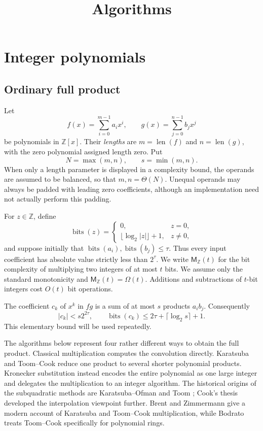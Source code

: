 \documentclass[11pt]{book}
\title{Algorithms}
\author{}
\date{}
\theoremstyle{definition}
\newcommand{\ZZ}{\mathbb Z}
\newcommand{\len}{\operatorname{len}}
\newcommand{\bits}{\operatorname{bits}}
\newcommand{\MZ}{\mathsf M_{\ZZ}}
\begin{document}
\maketitle
\tableofcontents

\chapter{Integer polynomials}

\section{Ordinary full product}

Let
\[
 f(x)=\sum_{i=0}^{m-1} a_i x^i,
 \qquad
 g(x)=\sum_{j=0}^{n-1} b_j x^j
\]
be polynomials in $\ZZ[x]$.  Their \emph{lengths} are $m=\len(f)$ and
$n=\len(g)$, with the zero polynomial assigned length zero.  Put
\[
 N=\max(m,n), \qquad s=\min(m,n).
\]
When only a length parameter is displayed in a complexity bound, the operands
are assumed to be balanced, so that $m,n=\Theta(N)$.  Unequal operands may
always be padded with leading zero coefficients, although an implementation
need not actually perform this padding.

For $z\in\ZZ$, define
\[
 \bits(z)=
 \begin{cases}
  0, & z=0,\\
  \lfloor\log_2|z|\rfloor+1, & z\ne0,
 \end{cases}
\]
and suppose initially that $\bits(a_i),\bits(b_j)\leq\tau$.  Thus every
input coefficient has absolute value strictly less than $2^\tau$.  We write
$\MZ(t)$ for the bit complexity of multiplying two integers of at most $t$
bits.  We assume only the standard monotonicity and $\MZ(t)=\Omega(t)$.
Additions and subtractions of $t$-bit integers cost $O(t)$ bit operations.

The coefficient $c_k$ of $x^k$ in $fg$ is a sum of at most $s$ products
$a_i b_j$.  Consequently
\begin{equation}\label{eq:product-coefficient-bound}
 |c_k| < s2^{2\tau},
 \qquad
 \bits(c_k)\leq 2\tau+\lceil\log_2 s\rceil+1.
\end{equation}
This elementary bound will be used repeatedly.

The algorithms below represent four rather different ways to obtain the full
product.  Classical multiplication computes the convolution directly.
Karatsuba and Toom--Cook reduce one product to several shorter polynomial
products.  Kronecker substitution instead encodes the entire polynomial as one
large integer and delegates the multiplication to an integer algorithm.  The
historical origins of the subquadratic methods are Karatsuba--Ofman
\cite{KaratsubaOfman1962} and Toom \cite{Toom1963}; Cook's thesis
\cite{Cook1966} developed the interpolation viewpoint further.  Brent and
Zimmermann \cite{BrentZimmermann2010} give a modern account of Karatsuba and
Toom--Cook multiplication, while Bodrato \cite{Bodrato2007} treats Toom--Cook
specifically for polynomial rings.
\end{document}

